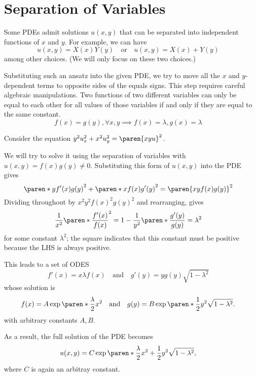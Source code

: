 \documentclass[11pt]{penrose}
\begin{document}
\section{Separation of Variables}
Some PDEs admit solutions $u(x,y)$ that can be separated into independent functions of $x$ and $y$. For example, we can have
\begin{equation}
    u(x,y) = X(x) Y(y)
    \quad\text{or}\quad
    u(x,y) = X(x) + Y(y)
\end{equation}
among other choices. (We will only focus on these two choices.)

Substituting such an ansatz into the given PDE, we try to move all the $x$ and $y$-dependent terms to opposite sides of the equals signs. This step requires careful algebraic manipulations. Two functions of two different variables can only be equal to each other for all values of those variables if and only if they are equal to the same constant.
\begin{equation}
    f(x) = g(y), \forall x,y
    \implies
    f(x) = \lambda, g(x) = \lambda
\end{equation}

\begin{negg}
    Consider the equation $y^2 u_x^2 + x^2 u_y^2 = \paren{xyu}^2$.

    We will try to solve it using the separation of variables with $u(x,y) = f(x)g(y) \neq 0$. Substituting this form of $u(x,y)$ into the PDE gives
    \begin{equation}
        \paren*{y f'(x) g(y)}^2 + \paren*{x f(x) g'(y)}^2 = \paren{xy f(x) g(y)}^2
    \end{equation}
    Dividing throughout by $x^2 y^2 f(x)^2 g(y)^2$ and rearranging, gives
    \begin{equation}
        \frac{1}{x^2}\paren*{\frac{f'(x)}{f(x)}}^2
        = 1 - \frac{1}{y^2} \paren*{\frac{g'(y)}{g(y)}} = \lambda^2
    \end{equation}
    for some constant $\lambda^2$; the square indicates that this constant must be positive because the LHS is always positive.

    This leads to a set of ODES
    \begin{equation}
        f'(x) = x\lambda f(x)
        \quad\text{and}\quad
        g'(y) = y g(y) \sqrt{1 - \lambda^2}
    \end{equation}
    whose solution is
    \begin{equation}
        f(x) = A \exp\paren*{ \frac{\lambda}{2} x^2}
        \quad\text{and}\quad
        g(y) = B \exp\paren*{ \frac{1}{2} y^2 \sqrt{1 - \lambda^2}}.
    \end{equation}
    with arbitrary constants $A, B$.

    As a result, the full solution of the PDE becomes
    \begin{equation}
        u(x,y) = C \exp\paren*{ \frac{\lambda}{2}x^2 + \frac{1}{2}y^2 \sqrt{1 - \lambda^2} },
    \end{equation}
    where $C$ is again an arbitray constant.
\end{negg}
\end{document}
